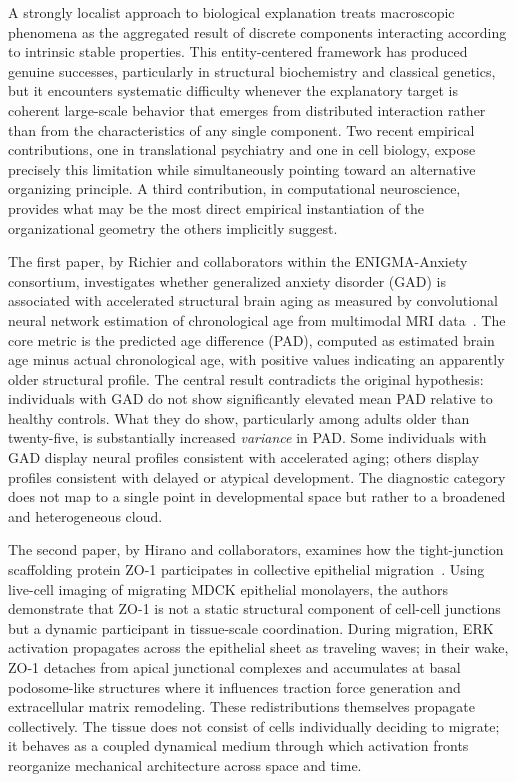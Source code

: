 \documentclass[11pt,a4paper]{article}
\theoremstyle{plain}
\theoremstyle{definition}
\begin{document}
A strongly localist approach to biological explanation treats macroscopic phenomena as
the aggregated result of discrete components interacting according to intrinsic stable
properties. This entity-centered framework has produced genuine successes, particularly
in structural biochemistry and classical genetics, but it encounters systematic difficulty
whenever the explanatory target is coherent large-scale behavior that emerges from
distributed interaction rather than from the characteristics of any single component.
Two recent empirical contributions, one in translational psychiatry and one in cell
biology, expose precisely this limitation while simultaneously pointing toward an
alternative organizing principle. A third contribution, in computational neuroscience,
provides what may be the most direct empirical instantiation of the organizational
geometry the others implicitly suggest.

The first paper, by Richier and collaborators within the ENIGMA-Anxiety consortium,
investigates whether generalized anxiety disorder (GAD) is associated with accelerated
structural brain aging as measured by convolutional neural network estimation of
chronological age from multimodal MRI data~\cite{Richier2026}. The core metric is the
predicted age difference (PAD), computed as estimated brain age minus actual chronological
age, with positive values indicating an apparently older structural profile. The central
result contradicts the original hypothesis: individuals with GAD do not show significantly
elevated mean PAD relative to healthy controls. What they do show, particularly among
adults older than twenty-five, is substantially increased \emph{variance} in PAD.
Some individuals with GAD display neural profiles consistent with accelerated aging;
others display profiles consistent with delayed or atypical development. The diagnostic
category does not map to a single point in developmental space but rather to a broadened
and heterogeneous cloud.

The second paper, by Hirano and collaborators, examines how the tight-junction scaffolding
protein ZO-1 participates in collective epithelial migration~\cite{Hirano2026}. Using
live-cell imaging of migrating MDCK epithelial monolayers, the authors demonstrate that
ZO-1 is not a static structural component of cell-cell junctions but a dynamic participant
in tissue-scale coordination. During migration, ERK activation propagates across the
epithelial sheet as traveling waves; in their wake, ZO-1 detaches from apical junctional
complexes and accumulates at basal podosome-like structures where it influences traction
force generation and extracellular matrix remodeling. These redistributions themselves
propagate collectively. The tissue does not consist of cells individually deciding to
migrate; it behaves as a coupled dynamical medium through which activation fronts
reorganize mechanical architecture across space and time.
\end{document}
